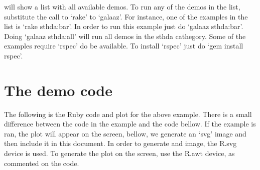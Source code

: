 \documentclass[11pt,]{article}
\begin{document}
will show a list with all available demos. To run any of the demos in
the list, substitute the call to `rake' to `galaaz'. For instance, one
of the examples in the list is `rake sthda:bar'. In order to run this
example just do `galaaz sthda:bar'. Doing `galaaz sthda:all' will run
all demos in the sthda cathegory. Some of the examples require `rspec'
do be available. To install `rspec' just do `gem install rspec'.

\section{The demo code}\label{the-demo-code}

The following is the Ruby code and plot for the above example. There is
a small difference between the code in the example and the code bellow.
If the example is ran, the plot will appear on the screen, bellow, we
generate an `svg' image and then include it in this document. In order
to generate and image, the R.svg device is used. To generate the plot on
the screen, use the R.awt device, as commented on the code.
\end{document}
